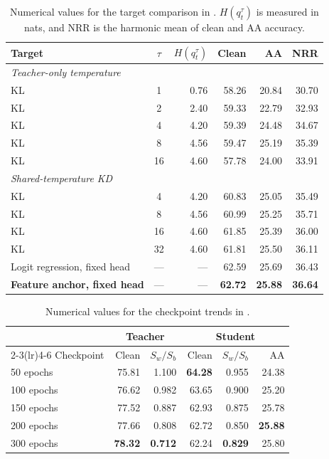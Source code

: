 \documentclass{article} %
\theoremstyle{plain}
\begin{document}
\begin{table}[!htbp]
  \centering \small \setlength{\tabcolsep}{4pt}
  \caption{Numerical values for the target comparison in .
  $H(q_t^\tau)$ is measured in nats, and NRR is the harmonic mean of clean and AA accuracy.}
  \label{tab:targetcomparison_values}
  \begin{tabular}{lcrrrr}
    \toprule
    Target & $\tau$ & $H(q_t^\tau)$ & Clean & AA & NRR \\
    \midrule
    \multicolumn{6}{l}{\emph{Teacher-only temperature}} \\
    KL & 1  & 0.76 & 58.26 & 20.84 & 30.70 \\
    KL & 2  & 2.40 & 59.33 & 22.79 & 32.93 \\
    KL & 4  & 4.20 & 59.39 & 24.48 & 34.67 \\
    KL & 8  & 4.56 & 59.47 & 25.19 & 35.39 \\
    KL & 16 & 4.60 & 57.78 & 24.00 & 33.91 \\
    \midrule
    \multicolumn{6}{l}{\emph{Shared-temperature KD}} \\
    KL & 4  & 4.20 & 60.83 & 25.05 & 35.49 \\
    KL & 8  & 4.56 & 60.99 & 25.25 & 35.71 \\
    KL & 16 & 4.60 & 61.85 & 25.39 & 36.00 \\
    KL & 32 & 4.60 & 61.81 & 25.50 & 36.11 \\
    \midrule
    Logit regression, fixed head  & --- & --- & 62.59 & 25.69 & 36.43 \\
    \textbf{Feature anchor, fixed head} & --- & --- & \textbf{62.72} & \textbf{25.88} & \textbf{36.64} \\
    \bottomrule
  \end{tabular}
\end{table}

\begin{table}[!htbp]
  \centering \small \setlength{\tabcolsep}{4pt}
  \caption{Numerical values for the checkpoint trends in .}
  \label{tab:teacherladder_values}
  \begin{tabular}{lrrrrr}
    \toprule
    & \multicolumn{2}{c}{Teacher} & \multicolumn{3}{c}{Student} \\
    \cmidrule(lr){2-3}\cmidrule(lr){4-6}
    Checkpoint & Clean & $S_w/S_b$ & Clean & $S_w/S_b$ & AA \\
    \midrule
    50 epochs  & 75.81 & 1.100 & \textbf{64.28} & 0.955 & 24.38 \\
    100 epochs & 76.62 & 0.982 & 63.65 & 0.900 & 25.20 \\
    150 epochs & 77.52 & 0.887 & 62.93 & 0.875 & 25.78 \\
    200 epochs & 77.66 & 0.808 & 62.72 & 0.850 & \textbf{25.88} \\
    300 epochs & \textbf{78.32} & \textbf{0.712} & 62.24 & \textbf{0.829} & 25.80 \\
    \bottomrule
  \end{tabular}
\end{table}
\end{document}
